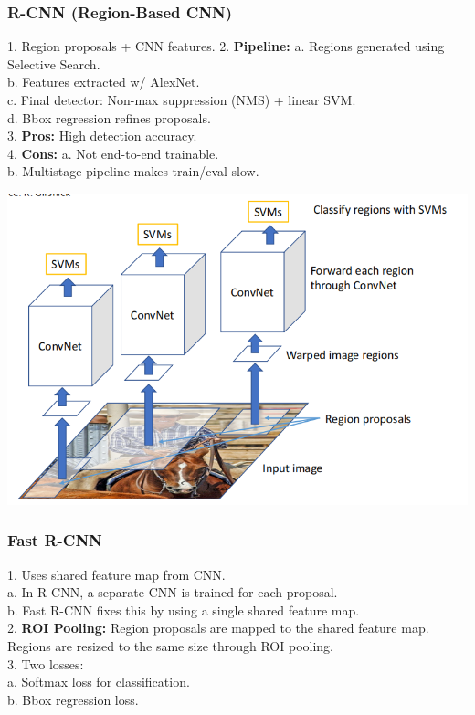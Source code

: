\subsubsection{R-CNN (Region-Based CNN)}
1. Region proposals + CNN features.  
2. \textbf{Pipeline:}  
   a. Regions generated using Selective Search.  \\
   b. Features extracted w/ AlexNet.  \\
   c. Final detector: Non-max suppression (NMS) + linear SVM.  \\
   d. Bbox regression refines proposals.  \\
3. \textbf{Pros:} High detection accuracy.  \\
4. \textbf{Cons:}  
   a. Not end-to-end trainable.  \\
   b. Multistage pipeline makes train/eval slow.

\includegraphics[width=1\linewidth]{images/rcnn.png}

\subsubsection{Fast R-CNN}
1. Uses shared feature map from CNN.  \\
   a. In R-CNN, a separate CNN is trained for each proposal.  \\
   b. Fast R-CNN fixes this by using a single shared feature map.  \\
2. \textbf{ROI Pooling:} 
   Region proposals are mapped to the shared feature map. Regions are resized to the same size through ROI pooling. \\
3. Two losses:   \\
   a. Softmax loss for classification.   \\
   b. Bbox regression loss. \\

